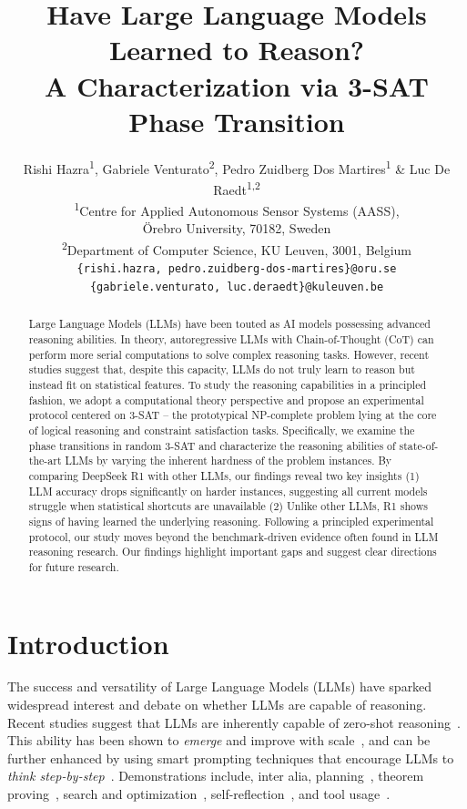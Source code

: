 \documentclass{article} %
\title{Have Large Language Models Learned to Reason?\\A Characterization via 3-SAT Phase Transition}
\author{
  Rishi Hazra\textsuperscript{1}, Gabriele Venturato\textsuperscript{2}, Pedro Zuidberg Dos Martires\textsuperscript{1} \& Luc De Raedt\textsuperscript{1,2} \\
  \textsuperscript{1}Centre for Applied Autonomous Sensor Systems (AASS), \\ \"{O}rebro University, 70182, Sweden \\
  \textsuperscript{2}Department of Computer Science, KU Leuven, 3001, Belgium \\
  \texttt{\{rishi.hazra, pedro.zuidberg-dos-martires\}@oru.se} \\
  \texttt{\{gabriele.venturato, luc.deraedt\}@kuleuven.be} \\
}
\begin{document}
\ifcolmsubmission
\linenumbers
\fi

\maketitle

\begin{abstract}
Large Language Models (LLMs) have been touted as AI models possessing advanced reasoning abilities. In theory, autoregressive LLMs with Chain-of-Thought (CoT) can perform more serial computations to solve complex reasoning tasks. However, recent studies suggest that, despite this capacity, LLMs do not truly learn to reason but instead fit on statistical features. To study the reasoning capabilities in a principled fashion, we adopt a computational theory perspective and propose an experimental protocol centered on 3-SAT -- the prototypical NP-complete problem lying at the core of logical reasoning and constraint satisfaction tasks. Specifically, we examine the phase transitions in random 3-SAT and characterize the reasoning abilities of state-of-the-art LLMs by varying the inherent hardness of the problem instances. By comparing DeepSeek R1 with other LLMs, our findings reveal two key insights (1) LLM accuracy drops significantly on harder instances, suggesting all current models struggle when statistical shortcuts are unavailable (2) Unlike other LLMs, R1 shows signs of having learned the underlying reasoning. Following a principled experimental protocol, our study moves beyond the benchmark-driven evidence often found in LLM reasoning research. Our findings highlight important gaps and suggest clear directions for future research.
\end{abstract}

\section{Introduction}
\label{section:introduction}


The success and versatility of Large Language Models (LLMs) have sparked widespread interest and debate on whether LLMs are capable of reasoning. Recent studies suggest that LLMs are inherently capable of zero-shot reasoning~\citep{llms_zero_shot_reasoners}. This ability has been shown to \emph{emerge} and improve with scale~\citep{wei2022emergent,bigbench}, and can be further enhanced by using smart prompting techniques that encourage LLMs to \textit{think step-by-step}~\citep{chain_of_thought,react}. Demonstrations include, inter alia, planning~\citep{llms_zero_shot_planners,saycan,saycanpay}, theorem proving~\citep{jiang2023draft,natural_prover,verifier_guided_proof}, search and optimization~\citep{llms_as_optimizers,fun_search,revolve}, self-reflection~\citep{tree_of_thoughts,selfrefine}, and tool usage~\citep{toolformer}. 
\end{document}
